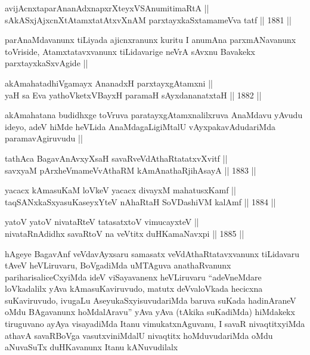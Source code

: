 
\begin{shl}
avijAcnxtaparAnanAdxnapxrXteyxVSA\s numitimaRtA ||  \\
sAkASxjAjxcnXtAtamxtatAtxvXnAM parxtayxkaSxtamameVva tatf ||  1881 ||  
\end{shl}

\begin{artha}
parAnaMdavanunx tiLiyada ajicnxranunx kuritu I anumAna parxmANavanunx
toVriside, Atamxtatavxvanunx tiLidavarige neVrA sAvxnu Bavakekx
parxtayxkaSxvAgide ||
\end{artha}


\begin{shl}
akAmahatadhiVgamayx AnanadxH parxtayxgAtamxni || \\
yaH sa Eva yathoVketxVBayxH paramaH sAyxdananatxtaH ||  1882 ||  
\end{shl}

\begin{artha}
akAmahatana budidhxge toVruva paratayxgAtamxnalilxruva AnaMdavu yAvudu
ideyo, adeV hiMde heVLida AnaMdagaLigiMtalU vAyxpakavAdudariMda
paramavAgiruvudu ||
\end{artha}


\begin{shl}
tathAca BagavAnAvxyXsaH savaRveVdAthaRtatatxvXvitf || \\
savxyaM pArxheVmameVvAthaRM kAmAnathaRjihAsayA ||  1883 ||  
\end{shl}
				
\begin{shl}
yacacx kAmasuKaM loVkeV yacacx divayxM mahatusxKamf || \\
taqSANxkaSxyasuKaseyxYteV nAhaRtaH SoVDashiVM kalAmf ||  1884 ||  
\end{shl}
				
\begin{shl}
yatoV yatoV nivataRteV tatasatxtoV vimucayxteV ||  \\
nivataRnAdidhx savaRtoV na veVtitx duHKamaNavxpi ||  1885 ||  
\end{shl}

\begin{artha}
hAgeye BagavAnf veVdavAyxsaru samasatx veVdAthaRtatavxvanunx
tiLidavaru tAveV heVLiruvaru, BoVgadiMda uMTAguva anathaRvanunx
pariharisaliceCxyiMda ideV viSayavanenx heVLiruvaru ``adeVneMdare
loVkadalilx yAva kAmasuKaviruvudo, matutx deVvaloVkada hecicxna
suKaviruvudo, ivugaLu AseyukaSxyisuvudariMda baruva suKada hadinAraneV
oMdu BAgavanunx hoMdalAravu'' yAva yAva (tAkika suKadiMda) hiMdakekx
tiruguvano ayAya visayadiMda Itanu vimukatxnAguvanu, I savaR
nivaqtitxyiMda athavA savaRBoVga vasutxviniMdalU nivaqtitx
hoMduvudariMda oMdu aNuvaSuTx duHKavanunx Itanu kANuvudilalx 
\end{artha}

